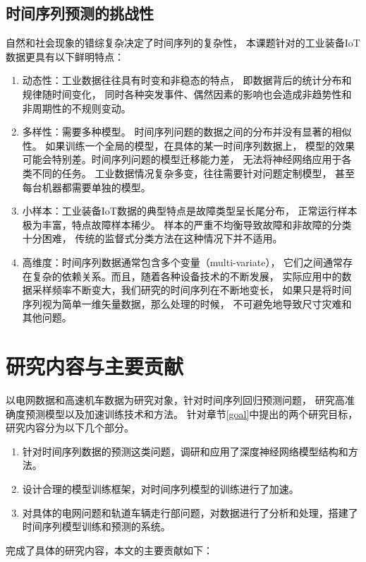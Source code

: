   \subsection{时间序列预测的挑战性}
    自然和社会现象的错综复杂决定了时间序列的复杂性，
    本课题针对的工业装备IoT数据更具有以下鲜明特点：
    \begin{enumerate}[(1)]
      \item 动态性：工业数据往往具有时变和非稳态的特点，
      即数据背后的统计分布和规律随时间变化，
      同时各种突发事件、偶然因素的影响也会造成非趋势性和非周期性的不规则变动。
      \item 多样性：需要多种模型。
      时间序列问题的数据之间的分布并没有显著的相似性。
      如果训练一个全局的模型，在具体的某一时间序列数据上，
      模型的效果可能会特别差。时间序列问题的模型迁移能力差，
      无法将神经网络应用于各类不同的任务。
      工业数据情况复杂多变，往往需要针对问题定制模型，
      甚至每台机器都需要单独的模型。
      \item 小样本：工业装备IoT数据的典型特点是故障类型呈长尾分布，
      正常运行样本极为丰富，特点故障样本稀少。
      样本的严重不均衡导致故障和非故障的分类十分困难，
      传统的监督式分类方法在这种情况下并不适用。
      \item 高维度：时间序列数据通常包含多个变量（multi-variate），
      它们之间通常存在复杂的依赖关系。而且，随着各种设备技术的不断发展，
      实际应用中的数据采样频率不断变大，我们研究的时间序列在不断地变长，
      如果只是将时间序列视为简单一维矢量数据，那么处理的时候，
      不可避免地导致尺寸灾难和其他问题。
    \end{enumerate}

\section{研究内容与主要贡献}
以电网数据和高速机车数据为研究对象，针对时间序列回归预测问题，
研究高准确度预测模型以及加速训练技术和方法。
针对章节\ref{goal}中提出的两个研究目标，研究内容分为以下几个部分。
\begin{enumerate}[(1)]
  \item 针对时间序列数据的预测这类问题，调研和应用了深度神经网络模型结构和方法。
  \item 设计合理的模型训练框架，对时间序列模型的训练进行了加速。
  \item 对具体的电网问题和轨道车辆走行部问题，对数据进行了分析和处理，搭建了时间序列模型训练和预测的系统。
\end{enumerate}

完成了具体的研究内容，本文的主要贡献如下：

